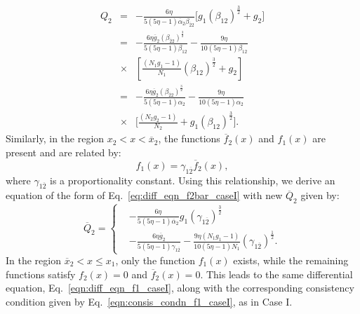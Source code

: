 \documentclass[final,3p,times,twocolumn]{elsarticle}
\begin{document}
            \begin{eqnarray}
                Q_{2}  &=&
                - \frac{6 \eta}{5 (5\eta -1)\overline{\alpha}_{2} \beta_{\overline{2}2}} \biggl[ g_{1} (\beta_{12})^\frac{3}{2} + g_{2} \biggr] \nonumber \\ 
                &=& -\frac{6 \eta \overline{g}_{2} (\beta_{\overline{2}2})^\frac{3}{2}}{5 (5 \eta -1) \beta_{12}} - \frac{9 \eta}{10 (5\eta-1) \beta_{12}} \nonumber \\ 
                &\times& \left[ \frac{(N_{1}g_{1} -1)}{N_{1}}(\beta_{12})^\frac{3}{2} + g_{2} \right] \nonumber \\
                &=& -\frac{6 \eta \overline{g}_{2} (\beta_{\overline{2}2})^\frac{3}{2}}{5 (5 \eta -1) \alpha_{2}} - \frac{9 \eta}{10 (5 \eta -1 ) \alpha_{2}} \nonumber \\ 
                &\times& \biggl[ \frac{(N_{2}g_{2} -1)}{N_{2}} + g_{1} (\beta_{12})^\frac{3}{2} \biggr].
                \label{eqn:consis_condn_f2_caseII}
            \end{eqnarray}
            Similarly, in the region $x_2 < x < \overline{x}_{2}$, the functions $\overline{f}_{2}(x)$ and $f_1(x)$ are present and are related by:  
            \[
            f_1(x) = \gamma_{1\overline{2}} \overline{f}_{2}(x),
            \]  
            where $\gamma_{1\overline{2}}$ is a proportionality constant. Using this relationship, we derive an equation of the form of Eq.~\eqref{eq:diff_eqn_f2bar_caseI} with new $\overline{Q}_2$ given by: 
            \begin{equation}
                \overline{Q}_{2} = \left\{ 
                \begin{aligned}
                    &  - \frac{6 \eta}{5 (5 \eta -1) \overline{\alpha}_{2}} g_{1} (\gamma_{1\overline{2}})^\frac{3}{2}\\ 
                    &   -\frac{6\eta \overline{g}_{2}}{5(5\eta-1) \gamma_{1\overline{2}}} - \frac{9 \eta (N_{1}g_{1} -1)}{10 (5\eta -1)N_{1}} (\gamma_{1\overline{2}})^\frac{1}{2}.
                \end{aligned}
                \right. \label{eqn:consis_condn_f2bar_caseII}
            \end{equation}
            In the region $\overline{x}_{2} < x \leq x_1$, only the function $f_1(x)$ exists, while the remaining functions satisfy $f_2(x) = 0$ and $\overline{f}_{2}(x) = 0$. This leads to the same differential equation, Eq.~\eqref{eqn:diff_eqn_f1_caseI}, along with the corresponding consistency condition given by Eq.~\eqref{eqn:consis_condn_f1_caseI}, as in Case I.
\end{document}
